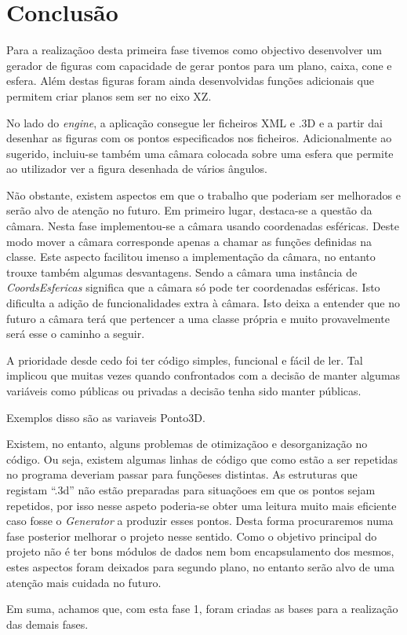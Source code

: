 \chapter{Conclusão}

Para a realizaçãoo desta primeira fase tivemos como objectivo desenvolver um gerador de figuras com capacidade de gerar pontos para um plano, caixa, cone e esfera.  Além destas figuras foram ainda desenvolvidas funções adicionais que permitem criar planos sem ser no eixo XZ. 

No lado do \textit{engine}, a aplicação consegue ler ficheiros XML e .3D e a partir dai desenhar as figuras com os pontos especificados nos ficheiros. Adicionalmente ao sugerido, incluiu-se também uma câmara colocada sobre uma esfera que permite ao utilizador ver a figura desenhada de vários ângulos. 


Não obstante, existem aspectos em que o trabalho que poderiam ser melhorados e serão alvo de atenção no futuro.  Em primeiro lugar, destaca-se a questão da câmara. Nesta fase implementou-se a câmara usando coordenadas esféricas. Deste modo mover a câmara corresponde apenas a chamar as funções definidas na classe. Este aspecto facilitou imenso a implementação da câmara, no entanto trouxe também algumas desvantagens. Sendo a câmara uma instância de \textit{CoordsEsfericas} significa que a câmara só pode ter coordenadas esféricas. Isto dificulta a adição de funcionalidades extra à câmara.  Isto deixa a entender que no futuro a câmara terá que pertencer a uma classe própria e muito provavelmente será esse o caminho a seguir.

A prioridade desde cedo foi ter código simples, funcional e fácil de ler. Tal implicou que muitas vezes quando confrontados com a decisão de manter algumas variáveis como públicas ou privadas a decisão tenha sido manter públicas.


Exemplos disso são as variaveis Ponto3D.


Existem, no entanto, alguns problemas de otimizaçãoo e desorganização
no código. Ou seja, existem algumas linhas de código que como estão a ser
repetidas no programa deveriam passar para funçõeses distintas. As estruturas
que registam “.3d” não estão preparadas para situaçõoes em que os pontos
sejam repetidos, por isso nesse aspeto poderia-se obter uma leitura muito
mais eficiente caso fosse o \textit{Generator} a produzir esses pontos. Desta forma
procuraremos numa fase posterior melhorar o projeto nesse sentido.
Como o objetivo principal do projeto não é ter bons módulos de dados nem bom encapsulamento dos mesmos, estes aspectos foram deixados para segundo plano, no entanto serão alvo de uma atenção mais cuidada no futuro.

Em suma, achamos que, com esta fase 1, foram criadas as bases para a
realização das demais fases.
